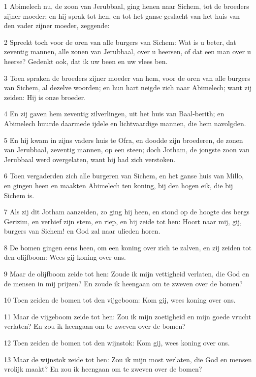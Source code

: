 \par 1 Abimelech nu, de zoon van Jerubbaal, ging henen naar Sichem, tot de broeders zijner moeder; en hij sprak tot hen, en tot het ganse geslacht van het huis van den vader zijner moeder, zeggende:
\par 2 Spreekt toch voor de oren van alle burgers van Sichem: Wat is u beter, dat zeventig mannen, alle zonen van Jerubbaal, over u heersen, of dat een man over u heerse? Gedenkt ook, dat ik uw been en uw vlees ben.
\par 3 Toen spraken de broeders zijner moeder van hem, voor de oren van alle burgers van Sichem, al dezelve woorden; en hun hart neigde zich naar Abimelech; want zij zeiden: Hij is onze broeder.
\par 4 En zij gaven hem zeventig zilverlingen, uit het huis van Baal-berith; en Abimelech huurde daarmede ijdele en lichtvaardige mannen, die hem navolgden.
\par 5 En hij kwam in zijns vaders huis te Ofra, en doodde zijn broederen, de zonen van Jerubbaal, zeventig mannen, op een steen; doch Jotham, de jongste zoon van Jerubbaal werd overgelaten, want hij had zich verstoken.
\par 6 Toen vergaderden zich alle burgeren van Sichem, en het ganse huis van Millo, en gingen heen en maakten Abimelech ten koning, bij den hogen eik, die bij Sichem is.
\par 7 Als zij dit Jotham aanzeiden, zo ging hij heen, en stond op de hoogte des bergs Gerizim, en verhief zijn stem, en riep, en hij zeide tot hen: Hoort naar mij, gij, burgers van Sichem! en God zal naar ulieden horen.
\par 8 De bomen gingen eens heen, om een koning over zich te zalven, en zij zeiden tot den olijfboom: Wees gij koning over ons.
\par 9 Maar de olijfboom zeide tot hen: Zoude ik mijn vettigheid verlaten, die God en de mensen in mij prijzen? En zoude ik heengaan om te zweven over de bomen?
\par 10 Toen zeiden de bomen tot den vijgeboom: Kom gij, wees koning over ons.
\par 11 Maar de vijgeboom zeide tot hen: Zou ik mijn zoetigheid en mijn goede vrucht verlaten? En zou ik heengaan om te zweven over de bomen?
\par 12 Toen zeiden de bomen tot den wijnstok: Kom gij, wees koning over ons.
\par 13 Maar de wijnstok zeide tot hen: Zou ik mijn most verlaten, die God en mensen vrolijk maakt? En zou ik heengaan om te zweven over de bomen?
